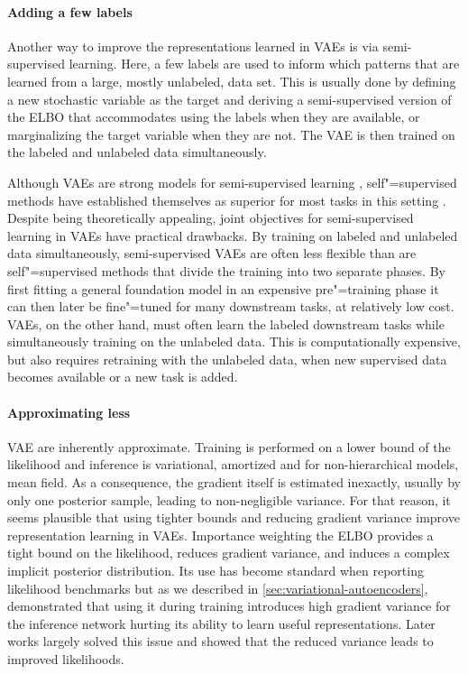 \paragraph{Adding a few labels} 
Another way to improve the representations learned in VAEs is via semi-supervised learning. 
Here, a few labels are used to inform which patterns that are learned from a large, mostly unlabeled, data set. 
This is usually done by defining a new stochastic variable as the target and deriving a semi-supervised version of the ELBO that accommodates using the labels when they are available, or marginalizing the target variable when they are not. The VAE is then trained on the labeled and unlabeled data simultaneously. 

Although VAEs are strong models for semi-supervised learning \parencite{kingma_semi-supervised_2014,kingma_improved_2016,maaloe_biva_2019}, self"=supervised methods have established themselves as superior for most tasks in this setting \cite{baevski_wav2vec_2020,jiang_speech_2021, liu_learning_2023}. 
Despite being theoretically appealing, joint objectives for semi-supervised learning in VAEs have practical drawbacks. By training on labeled and unlabeled data simultaneously, semi-supervised VAEs are often less flexible than are self"=supervised methods that divide the training into two separate phases. By first fitting a general foundation model in an expensive pre"=training phase it can then later be fine"=tuned for many downstream tasks, at relatively low cost. 
VAEs, on the other hand, must often learn the labeled downstream tasks while simultaneously training on the unlabeled data. This is computationally expensive, but also requires retraining with the unlabeled data, when new supervised data becomes available or a new task is added. 


\paragraph*{Approximating less}
VAE are inherently approximate. Training is performed on a lower bound of the likelihood and inference is variational, amortized and for non-hierarchical models, mean field. As a consequence, the gradient itself is estimated inexactly, usually by only one posterior sample, leading to non-negligible variance. 
For that reason, it seems plausible that using tighter bounds and reducing gradient variance improve representation learning in VAEs. 
Importance weighting the ELBO \parencite{burda_importance_2016} provides a tight bound on the likelihood, reduces gradient variance, and induces a complex implicit posterior distribution. 
Its use has become standard when reporting likelihood benchmarks but as we described in \cref{sec:variational-autoencoders}, \textcite{rainforth_tighter_2019} demonstrated that using it during training introduces high gradient variance for the inference network hurting its ability to learn useful representations. Later works largely solved this issue \parencite{roeder_sticking_2017,tucker_doubly_2019,bauer_generalized_2021} and showed that the reduced variance leads to improved likelihoods. 

